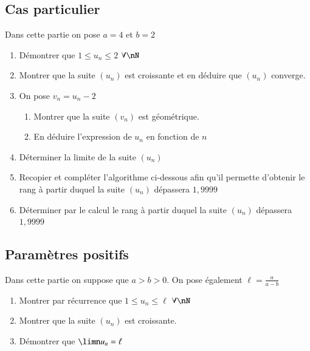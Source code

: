 \documentclass[oneside,12pt]{article}
\begin{document}
\subsection{Cas particulier}
Dans cette partie on pose $a=4$ et $b=2$
\begin{enumerate}
    \item Démontrer que $1\leq u_n\leq2$ \quad $\forall\nN$
    \item Montrer que la suite $(u_n)$ est croissante et en déduire que $(u_n)$ converge.
    \item On pose $v_n=u_n-2$
    \begin{enumerate}
        \item Montrer que la suite $(v_n)$ est géométrique.
        \item En déduire l'expression de $u_n$ en fonction de $n$
    \end{enumerate}
    \item Déterminer la limite de la suite $(u_n)$
        \item Recopier et compléter l'algorithme ci-dessous afin qu'il permette d'obtenir le rang à partir duquel la suite $(u_n)$ dépassera $1,9999$
        \begin{center}
    \end{center}
    \item Déterminer par le calcul le rang à partir duquel la suite $(u_n)$ dépassera $1,9999$
\end{enumerate}

\subsection{Paramètres positifs}
Dans cette partie on suppose que $a>b>0$. On pose également $\ell=\frac{a}{a-b}$
\begin{enumerate}
    \item Montrer par récurrence que $1\leq u_n\leq\ell$ \quad $\forall\nN$
    \item Montrer que la suite $(u_n)$ est croissante.
    \item Démontrer que $\limn u_n=\ell$
\end{enumerate}
\end{document}
